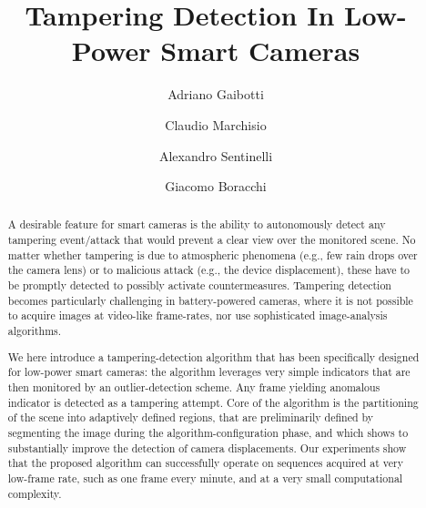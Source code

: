\documentclass{llncs}
\begin{document}
\title{Tampering Detection In Low-Power Smart Cameras}

\author{Adriano Gaibotti \and Claudio Marchisio \and Alexandro Sentinelli \and Giacomo Boracchi}

\maketitle

\begin{abstract}
A desirable feature for smart cameras is the ability to autonomously detect any tampering event/attack that would prevent a clear view over the monitored scene. No matter whether tampering is due to atmospheric phenomena (e.g., few rain drops over the camera lens) or to malicious attack (e.g., the device displacement), these have to be promptly detected to possibly activate countermeasures. Tampering detection becomes particularly challenging in battery-powered cameras, where it is not possible to acquire images at video-like frame-rates, nor use sophisticated image-analysis algorithms. 

We here introduce a tampering-detection algorithm that has been specifically designed for low-power smart cameras: the algorithm leverages very simple indicators that are then monitored by an outlier-detection scheme. Any frame yielding anomalous indicator is detected as a tampering attempt. Core of the algorithm is the partitioning of the scene into adaptively defined regions, that are preliminarily defined by segmenting the image during the algorithm-configuration phase, and which shows to substantially improve the detection of camera displacements. Our experiments show that the proposed algorithm can successfully operate on sequences acquired at very low-frame rate, such as one frame every minute, and at a very small computational complexity. %


\end{abstract}
\end{document}
